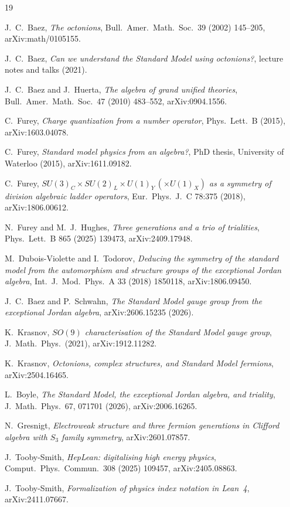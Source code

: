\documentclass[11pt]{article}
\begin{document}
\begin{thebibliography}{19}

J.~C.~Baez, \emph{The octonions},
Bull.\ Amer.\ Math.\ Soc.\ 39 (2002) 145--205, arXiv:math/0105155.

J.~C.~Baez, \emph{Can we understand the Standard Model using octonions?},
lecture notes and talks (2021).

J.~C.~Baez and J.~Huerta, \emph{The algebra of grand unified theories},
Bull.\ Amer.\ Math.\ Soc.\ 47 (2010) 483--552, arXiv:0904.1556.

C.~Furey, \emph{Charge quantization from a number operator},
Phys.\ Lett.\ B (2015), arXiv:1603.04078.

C.~Furey, \emph{Standard model physics from an algebra?},
PhD thesis, University of Waterloo (2015), arXiv:1611.09182.

C.~Furey, \emph{$SU(3)_C \times SU(2)_L \times U(1)_Y\,(\times U(1)_X)$
as a symmetry of division algebraic ladder operators},
Eur.\ Phys.\ J.\ C 78:375 (2018), arXiv:1806.00612.

N.~Furey and M.~J.~Hughes, \emph{Three generations and a trio of
trialities}, Phys.\ Lett.\ B 865 (2025) 139473, arXiv:2409.17948.

M.~Dubois-Violette and I.~Todorov, \emph{Deducing the symmetry of the
standard model from the automorphism and structure groups of the
exceptional Jordan algebra}, Int.\ J.\ Mod.\ Phys.\ A 33 (2018) 1850118,
arXiv:1806.09450.

J.~C.~Baez and P.~Schwahn, \emph{The Standard Model gauge group from
the exceptional Jordan algebra}, arXiv:2606.15235 (2026).

K.~Krasnov, \emph{$SO(9)$ characterisation of the Standard Model gauge
group}, J.\ Math.\ Phys.\ (2021), arXiv:1912.11282.

K.~Krasnov, \emph{Octonions, complex structures, and Standard Model
fermions}, arXiv:2504.16465.

L.~Boyle, \emph{The Standard Model, the exceptional Jordan algebra, and
triality}, J.\ Math.\ Phys.\ 67, 071701 (2026), arXiv:2006.16265.

N.~Gresnigt, \emph{Electroweak structure and three fermion generations
in Clifford algebra with $S_3$ family symmetry}, arXiv:2601.07857.

J.~Tooby-Smith, \emph{HepLean: digitalising high energy physics},
Comput.\ Phys.\ Commun.\ 308 (2025) 109457, arXiv:2405.08863.

J.~Tooby-Smith, \emph{Formalization of physics index notation in
Lean~4}, arXiv:2411.07667.

\end{thebibliography}
\end{document}
